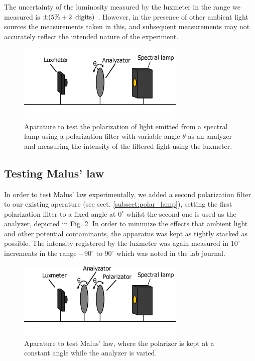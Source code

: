 \documentclass[11pt,a4paper, twocolumn]{article}
\begin{document}
    The uncertainty of the luminosity measured by the luxmeter in the range we measured is $\pm (5\% + 2\enspace \textup{digits})$ \cite{data:luxmeter}. However, in the presence of other ambient light sources the measurements taken in this, and subsequent measurements may not accurately reflect the intended nature of the experiment.


  \begin{figure}[H]
    \center
    \includegraphics[width=8cm]{scripts/figs/diagram_1.png}
    \caption{Aparature to test the polarization of light emitted from a spectral lamp using a polarization filter with variable angle $\theta$ as an analyzer and measuring the intensity of the filtered light using the luxmeter.}
    \label{fig:lux_ana_lamp}
  \end{figure}

  \subsection{Testing Malus' law}

    In order to test Malus' law experimentally, we added a second polarization filter to our existing aperature (see sect. \ref{subsect:polar_lamp}), setting the first polarization filter to a fixed angle at $0^\circ$ whilst the second one is used as the analyzer, depicted in Fig. \ref{fig:lux_ana_pola_lamp}. In order to minimize the effects that ambient light and other potential contaminants, the apparatus was kept as tightly stacked as possible. The intensity registered by the luxmeter was again measured in $10^\circ$ increments in the range $-90^\circ$ to $90^\circ$ which was noted in the lab journal. 

    \begin{figure}[H]
      \center
      \includegraphics[width=8cm]{scripts/figs/diagram_2.png}
      \caption{Aparature to test Malus' law, where the polarizer is kept at a constant angle while the analyzer is varied.}
      \label{fig:lux_ana_pola_lamp}
    \end{figure}
\end{document}
